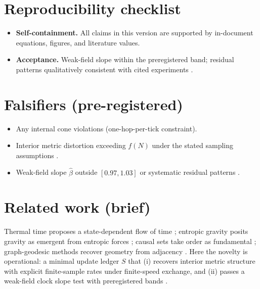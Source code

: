\section*{Reproducibility checklist}
\begin{itemize}
  \item \textbf{Self-containment.} All claims in this version are supported by in-document equations, figures, and literature values.
  \item \textbf{Acceptance.} Weak-field slope within the preregistered band; residual patterns qualitatively consistent with cited experiments \cite{poundrebka1960,vessot1980,hafelekeating1972}.
\end{itemize}

\section*{Falsifiers (pre-registered)}
\begin{itemize}
  \item Any internal cone violations (one-hop-per-tick constraint).
  \item Interior metric distortion exceeding $f(N)$ under the stated sampling assumptions \cite{penrose2003}.
  \item Weak-field slope $\hat\beta$ outside $[0.97,1.03]$ or systematic residual patterns \cite{vessot1980,hafelekeating1972}.
\end{itemize}

\clearpage
\section*{Related work (brief)}
Thermal time proposes a state-dependent flow of time \cite{connesrovelli1994}; entropic gravity posits gravity as emergent from entropic forces \cite{verlinde2011}; causal sets take order as fundamental \cite{bombelli1987}; graph-geodesic methods recover geometry from adjacency \cite{tenenbaum2000,penrose2003}. Here the novelty is operational: a minimal update ledger $S$ that (i) recovers interior metric structure with explicit finite-sample rates under finite-speed exchange, and (ii) passes a weak-field clock slope test with preregistered bands \cite{poundrebka1960,vessot1980}.

